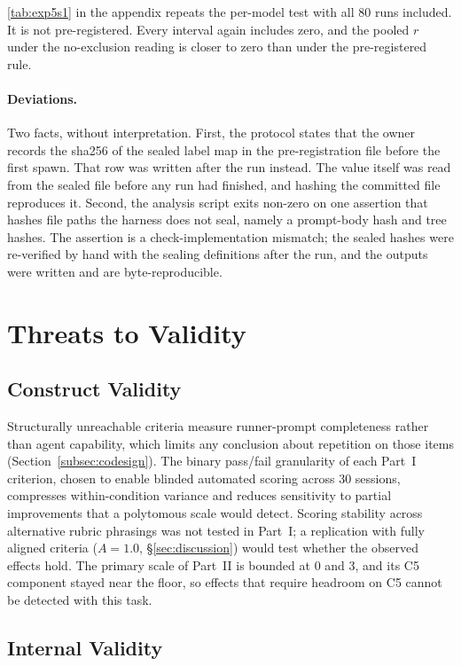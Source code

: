 \documentclass[11pt,a4paper]{article}
\begin{document}
\autoref{tab:exp5s1} in the appendix repeats the per-model test with all 80 runs included.
It is not pre-registered.
Every interval again includes zero, and the pooled $r$ under the no-exclusion reading is closer to zero than under the pre-registered rule.

\paragraph{Deviations.}
\label{subsec:exp5deviations}
Two facts, without interpretation.
First, the protocol states that the owner records the sha256 of the sealed label map in the pre-registration file before the first spawn.
That row was written after the run instead.
The value itself was read from the sealed file before any run had finished, and hashing the committed file reproduces it.
Second, the analysis script exits non-zero on one assertion that hashes file paths the harness does not seal, namely a prompt-body hash and tree hashes.
The assertion is a check-implementation mismatch; the sealed hashes were re-verified by hand with the sealing definitions after the run, and the outputs were written and are byte-reproducible.

\section{Threats to Validity}
\label{sec:threats}

\subsection{Construct Validity}

Structurally unreachable criteria measure runner-prompt completeness rather than agent capability, which limits any conclusion about repetition on those items (Section~\ref{subsec:codesign}).
The binary pass/fail granularity of each Part~I criterion, chosen to enable blinded automated scoring across 30 sessions, compresses within-condition variance and reduces sensitivity to partial improvements that a polytomous scale would detect.
Scoring stability across alternative rubric phrasings was not tested in Part~I; a replication with fully aligned criteria ($A{=}1.0$, \S\ref{sec:discussion}) would test whether the observed effects hold.
The primary scale of Part~II is bounded at 0 and 3, and its C5 component stayed near the floor, so effects that require headroom on C5 cannot be detected with this task.

\subsection{Internal Validity}
\end{document}
